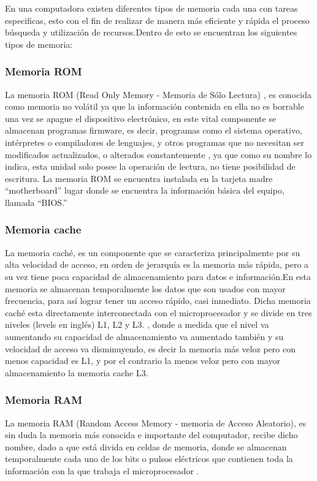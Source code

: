 \documentclass{article}
\begin{document}
En una computadora existen diferentes tipos de memoria cada una con tareas especificas, esto con el fin de realizar de manera más eficiente y rápida el proceso búsqueda y utilización de recursos.Dentro de esto se encuentran los siguientes tipos de memoria:

\subsubsection{Memoria ROM}
La memoria ROM (Read Only Memory - Memoria de Sólo Lectura) \cite{augusto}, es conocida como memoria no volátil ya que la información contenida en ella
no es borrable una vez se apague el dispositivo electrónico, en este vital componente se almacenan programas firmware, es decir, programas como el
sistema operativo, intérpretes o compiladores de lenguajes, y otros programas que no necesitan ser modificados actualizados, o alterados constantemente \cite{memorias}, ya que como su nombre lo indica, esta unidad solo posee la operación de lectura, no tiene posibilidad de escritura.
La memoria ROM se encuentra instalada en la tarjeta madre “motherboard” lugar donde se encuentra la información básica del equipo, llamada “BIOS.”


\subsubsection{Memoria cache}
La memoria caché, es un componente que se caracteriza principalmente por su alta velocidad de acceso, en orden de jerarquía es la memoria más rápida, pero a su vez tiene poca capacidad de almacenamiento para datos e información.En esta memoria se almacenan temporalmente los datos que son usados con mayor frecuencia, para así lograr tener un acceso rápido, casi inmediato\cite{arquitectura}. Dicha memoria caché esta directamente interconectada con el microprocesador y se divide en tres niveles (levels en inglés) L1, L2 y L3. \cite{augusto}, donde a medida que el nivel va aumentando su capacidad de almacenamiento va aumentado también y su velocidad de acceso va disminuyendo, es decir la memoria más veloz pero con menos capacidad es L1, y por el contrario la menos veloz pero con mayor almacenamiento la memoria cache L3.

\subsubsection{Memoria RAM}
La memoria RAM (Random Access Memory - memoria de Acceso Aleatorio), es sin duda la memoria más conocida e importante del computador, recibe dicho nombre, dado a que está divida en celdas de memoria, donde se almacenan temporalmente cada uno de los bits o pulsos eléctricos que contienen toda la información con la que trabaja el microprocesador \cite{augusto}.\\
\end{document}
